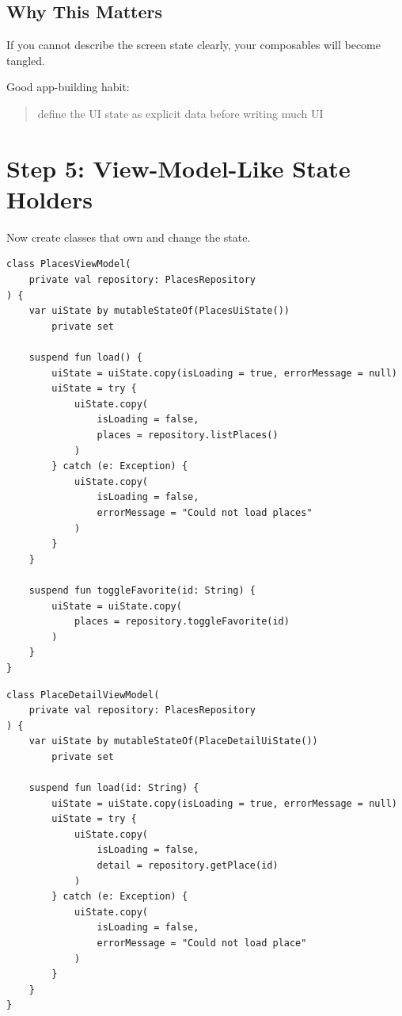 \documentclass[11pt,a4paper]{article}
\begin{document}
\subsection{Why This Matters}

If you cannot describe the screen state clearly, your composables will become tangled.

Good app-building habit:
\begin{quote}
define the UI state as explicit data before writing much UI
\end{quote}

\section{Step 5: View-Model-Like State Holders}

Now create classes that own and change the state.

\begin{lstlisting}[style=kazekotlin]
class PlacesViewModel(
    private val repository: PlacesRepository
) {
    var uiState by mutableStateOf(PlacesUiState())
        private set

    suspend fun load() {
        uiState = uiState.copy(isLoading = true, errorMessage = null)
        uiState = try {
            uiState.copy(
                isLoading = false,
                places = repository.listPlaces()
            )
        } catch (e: Exception) {
            uiState.copy(
                isLoading = false,
                errorMessage = "Could not load places"
            )
        }
    }

    suspend fun toggleFavorite(id: String) {
        uiState = uiState.copy(
            places = repository.toggleFavorite(id)
        )
    }
}
\end{lstlisting}

\begin{lstlisting}[style=kazekotlin]
class PlaceDetailViewModel(
    private val repository: PlacesRepository
) {
    var uiState by mutableStateOf(PlaceDetailUiState())
        private set

    suspend fun load(id: String) {
        uiState = uiState.copy(isLoading = true, errorMessage = null)
        uiState = try {
            uiState.copy(
                isLoading = false,
                detail = repository.getPlace(id)
            )
        } catch (e: Exception) {
            uiState.copy(
                isLoading = false,
                errorMessage = "Could not load place"
            )
        }
    }
}
\end{lstlisting}
\end{document}
